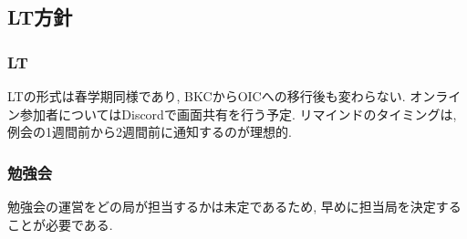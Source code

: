\subsection*{LT方針}


\subsubsection*{LT}
LTの形式は春学期同様であり, BKCからOICへの移行後も変わらない.
オンライン参加者についてはDiscordで画面共有を行う予定.
リマインドのタイミングは, 例会の1週間前から2週間前に通知するのが理想的.

\subsubsection*{勉強会}
勉強会の運営をどの局が担当するかは未定であるため, 早めに担当局を決定することが必要である.
